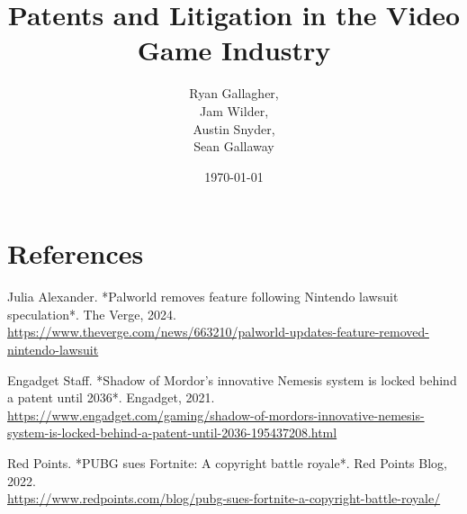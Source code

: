 \documentclass{article}
\title{Patents and Litigation in the Video Game Industry}
\author{Ryan Gallagher,
\\ Jam Wilder,
\\ Austin Snyder,
\\ Sean Gallaway}
\date{\today}
\begin{document}
\maketitle


\section*{References}

\noindent
\textbf{\cite{Palworld}} Julia Alexander. *Palworld removes feature following Nintendo lawsuit speculation*. The Verge, 2024. \\
\url{https://www.theverge.com/news/663210/palworld-updates-feature-removed-nintendo-lawsuit}

\vspace{0.5em}

\noindent
\textbf{\cite{Nemesis}} Engadget Staff. *Shadow of Mordor’s innovative Nemesis system is locked behind a patent until 2036*. Engadget, 2021. \\
\url{https://www.engadget.com/gaming/shadow-of-mordors-innovative-nemesis-system-is-locked-behind-a-patent-until-2036-195437208.html}

\vspace{0.5em}

\noindent
\textbf{\cite{PUBGvsFortnite}} Red Points. *PUBG sues Fortnite: A copyright battle royale*. Red Points Blog, 2022. \\
\url{https://www.redpoints.com/blog/pubg-sues-fortnite-a-copyright-battle-royale/}
\end{document}
